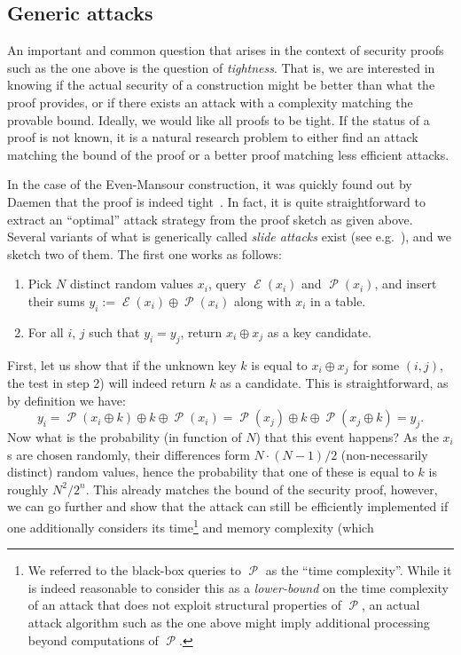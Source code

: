 \documentclass[11pt,a4paper]{article}
\theoremstyle{definition}
\DeclareMathOperator\E{\mathcal{E}}
\DeclareMathOperator\Perm{\mathcal{P}}
\begin{document}
\subsection{Generic attacks}

An important and common question that arises in the context of security proofs such as the one above is the question of \emph{tightness}.
That is, we are interested in knowing if the actual security of a construction might be better than what the proof provides, or if there
exists an attack with a complexity matching the provable bound.
Ideally, we would like all proofs to be tight. If the status of a proof is not known, it is a natural research problem to either find an attack
matching the bound of the proof or a better proof matching less efficient attacks.

In the case of the Even-Mansour construction, it was quickly found out by Daemen that the proof is indeed tight~\cite{DBLP:conf/asiacrypt/Daemen91}. In fact, it is quite
straightforward to extract an ``optimal'' attack strategy from the proof sketch as given above. Several variants of what is generically
called \emph{slide attacks} exist (see e.g.~\cite{DBLP:conf/eurocrypt/DunkelmanKS12}), and we sketch two of them. The first one works as follows:
\begin{enumerate}
\item Pick $N$ distinct random values $x_i$, query $\E(x_i)$ and $\Perm(x_i)$, and insert their sums $y_i := \E(x_i) \oplus \Perm(x_i)$ along
with $x_i$ in a table.
\item For all $i$, $j$ such that $y_i = y_j$, return $x_i \oplus x_j$ as a key candidate.
\end{enumerate}
First, let us show that if the unknown key $k$ is equal to $x_i \oplus x_j$ for some $(i,j)$, the test in step 2) will indeed return $k$ as a candidate. This
is straightforward, as by definition we have:
\[
y_i = \Perm(x_i \oplus k) \oplus k \oplus \Perm(x_i) = \Perm(x_j) \oplus k \oplus \Perm(x_j \oplus k) = y_j.
\]
Now what is the probability (in function of $N$) that this event happens? As the $x_i$s are chosen randomly, their differences form
$N\cdot(N-1)/2$ (non-necessarily distinct) random values, hence the probability that one of these is equal to
$k$ is roughly $N^2/2^n$. This already matches the bound of the security proof, however, we can go further and show
that the attack can still be efficiently implemented if one additionally considers its time\footnote{We referred to the black-box queries
to $\Perm$ as the ``time complexity''. While it is indeed reasonable to consider this as a \emph{lower-bound} on the time complexity
of an attack that does not exploit structural properties of $\Perm$, an actual attack algorithm such as the one above might
imply additional processing beyond computations of $\Perm$.}   and memory complexity (which
\end{document}
